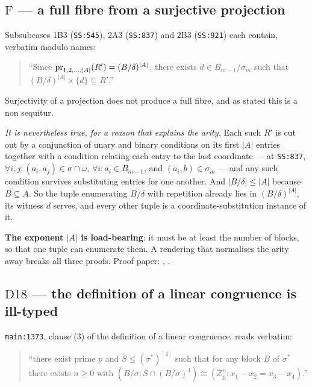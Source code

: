 \subsection{$\mathrm F$ --- a full fibre from a surjective projection}\label{sec:F}

Subsubcases 1B3 (\texttt{SS:545}), 2A3 (\texttt{SS:837}) and 2B3
(\texttt{SS:921}) each contain, verbatim modulo names:

\begin{quote}\small
``Since $\operatorname*{pr}_{1,2,\dots,|A|}(R')=(B/\delta)^{|A|}$, there exists
$d\in B_{m-1}/\sigma_{m}$ such that $(B/\delta)^{|A|}\times\{d\}\subseteq R'$.''
\end{quote}

Surjectivity of a projection does not produce a full fibre, and as stated this
is a non sequitur.

\emph{It is nevertheless true, for a reason that explains the arity.} Each such
$R'$ is cut out by a conjunction of unary and binary conditions on its first
$|A|$ entries together with a condition relating each entry to the last
coordinate --- at \texttt{SS:837}, $\forall i,j:(a_{i},a_{j})\in\sigma\cap
\omega$, $\forall i:a_{i}\in B_{m-1}$, and $(a_{i},b)\in\sigma_{m}$ --- and any
such condition survives substituting entries for one another. And
$|B/\delta|\le|A|$ because $B\subseteq A$. So the tuple enumerating $B/\delta$
with repetition already lies in $(B/\delta)^{|A|}$, its witness $d$ serves, and
every other tuple is a coordinate-substitution instance of it.

\textbf{The exponent $|A|$ is load-bearing}: it must be at least the number of
blocks, so that one tuple can enumerate them. A rendering that normalises the
arity away breaks all three proofs. Proof paper: ,
.

\subsection{$\mathrm D{18}$ --- the definition of a linear congruence is ill-typed}
\label{sec:D18}

\texttt{main:1373}, clause (3) of the definition of a linear congruence, reads
verbatim:

\begin{quote}\small
``there exist prime $p$ and $S\le(\sigma^{*})^{[4]}$ such that for any block
$B$ of $\sigma^{*}$ there exists $n\ge0$ with
$(B/\sigma;S\cap(B/\sigma)^{4})\cong(\mathbb Z_{p}^{n};x_{1}-x_{2}=x_{3}-x_{4})$.''
\end{quote}

